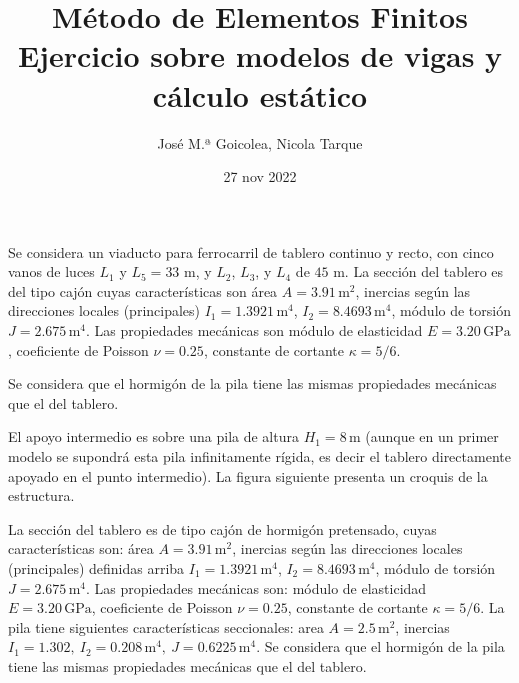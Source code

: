 \documentclass[a4paper,12pt]{article}
\title{\large Método de Elementos Finitos\\
\bf Ejercicio sobre modelos de vigas y cálculo estático}
\author{José M.ª Goicolea, Nicola Tarque}
\date{27 nov 2022}
\begin{document}
\maketitle
\thispagestyle{empty}

Se considera un viaducto para ferrocarril de tablero continuo y recto, con cinco vanos de luces $L_{1}$ y $L_{5}= 33$ m, y $L_{2}$, $L_{3}$, y $L_{4}$ de $45$ m. La sección del tablero es del tipo cajón cuyas características son área $A=3.91\,\text{m}^{2}$, inercias según las direcciones locales (principales) $I_{1}=1.3921\,\text{m}^{4}$, $I_{2}=8.4693\,\text{m}^{4}$, módulo de torsión $J=2.675\,\text{m}^{4}$. 
Las propiedades mecánicas son módulo de elasticidad $E=3.20\,\text{GPa}$, coeficiente de Poisson $\nu=0.25$, constante de cortante $\kappa=5/6$. 

 
Se considera que el hormigón de la pila tiene las mismas propiedades mecánicas que el del tablero.



El apoyo intermedio es sobre una pila de altura $H_{1}=8\,\text{m}$ (aunque en un primer modelo se supondrá esta pila infinitamente rígida, es decir el tablero directamente apoyado en el punto intermedio). La figura siguiente presenta un croquis de la estructura.
\begin{figure}[h!]
\end{figure}

La sección del tablero es de tipo cajón de hormigón pretensado, cuyas características son: área $A=3.91\,\text{m}^{2}$, inercias según las direcciones locales (principales) definidas arriba  $I_{1}=1.3921\,\text{m}^{4}$, $I_{2}=8.4693\,\text{m}^{4}$, módulo de torsión $J=2.675\,\text{m}^{4}$. 
Las propiedades mecánicas son: módulo de elasticidad $E=3.20\,\text{GPa}$, coeficiente de Poisson $\nu=0.25$, constante de cortante $\kappa=5/6$. 
La pila tiene siguientes características seccionales: area $A=2.5\,\text{m}^{2}$, inercias $I_{1}=1.302,~ I_{2}=0.208\,\text{m}^{4},\ J=0.6225\,\text{m}^{4}$. 
Se considera que el hormigón de la pila tiene las mismas propiedades mecánicas que el del tablero.
\end{document}
